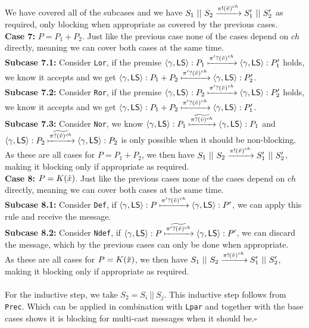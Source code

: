 We have covered all of the subcases and we have $S_1\ ||\ S_2 \xrightarrow[]{\pi !(\Tilde{v})^{ch}}S_1'\ ||\ S_2'$ as required, only blocking when appropriate as covered by the previous cases. \\
\textbf{Case 7: } $P=P_1 + P_2$. Just like the previous case none of the cases depend on $ch$ directly, meaning we can cover both cases at the same time.\\
\indent \textbf{Subcase 7.1: } Consider \texttt{Lor}, if the premise $\langle \gamma , \mathsf{LS} \rangle : P_1 \xmapsto[]{\pi ' ? (\Tilde{v})^{ch}}\langle \gamma , \mathsf{LS} \rangle : P_1'$ holds, we know it accepts and we get $\langle \gamma , \mathsf{LS} \rangle : P_1+P_2 \xmapsto[]{\pi ' ? (\Tilde{v})^{ch}}\langle \gamma , \mathsf{LS} \rangle : P_2'$. \\
\indent \textbf{Subcase 7.2: } Consider \texttt{Ror}, if the premise $\langle \gamma , \mathsf{LS} \rangle : P_2 \xmapsto[]{\pi ' ? (\Tilde{v})^{ch}}\langle \gamma , \mathsf{LS} \rangle : P_2'$ holds, we know it accepts and we get $\langle \gamma , \mathsf{LS} \rangle : P_1+P_2 \xmapsto[]{\pi ' ? (\Tilde{v})^{ch}}\langle \gamma , \mathsf{LS} \rangle : P_1'$.\\
\indent \textbf{Subcase 7.3: } Consider \texttt{Nor}, we know $\langle \gamma, \mathsf{LS}\rangle : P_1 \xmapsto[]{\widetilde{\pi ?(\Tilde{v})^{ch}}}\langle \gamma, \mathsf{LS}\rangle : P_1$ and $\langle \gamma, \mathsf{LS}\rangle : P_2 \xmapsto[]{\widetilde{\pi ?(\Tilde{v})^{ch}}}\langle \gamma, \mathsf{LS}\rangle : P_2$ is only possible when it should be non-blocking. \\
As these are all cases for $P=P_1+P_2$, we then have $S_1\ ||\ S_2 \xrightarrow[]{\pi !(\Tilde{v})^{ch}}S_1'\ ||\ S_2'$, making it blocking only if appropriate as required.\\
\textbf{Case 8: } $P=K(\Tilde{x})$. Just like the previous cases none of the cases depend on $ch$ directly, meaning we can cover both cases at the same time.\\
\indent \textbf{Subcase 8.1: } Consider \texttt{Def}, if $\langle \gamma , \mathsf{LS} \rangle : P \xmapsto[]{\pi ' ? (\Tilde{v})^{ch}}\langle \gamma , \mathsf{LS} \rangle : P'$, we can apply this rule and receive the message.\\
\indent \textbf{Subcase 8.2: } Consider \texttt{Ndef}, if $\langle \gamma , \mathsf{LS} \rangle : P \xmapsto[]{\widetilde{\pi ' ? (\Tilde{v})^{ch}}}\langle \gamma , \mathsf{LS} \rangle : P'$, we can discard the message, which by the previous cases can only be done when appropriate.\\
As these are all cases for $P=K(\Tilde{x})$, we then have $S_1\ ||\ S_2 \xrightarrow[]{\pi !(\Tilde{v})^{ch}}S_1'\ ||\ S_2'$, making it blocking only if appropriate as required.\\
\\
For the inductive step, we take $S_2=S_i\ ||\ S_j $. This inductive step follows from \texttt{Prec}. Which can be applied in combination with \texttt{Lpar} and together with the base cases shows it is blocking for multi-cast messages when it should be.$\square$\\
